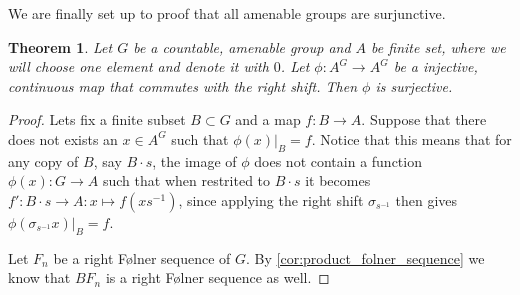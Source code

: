 \documentclass[titlepage, a4paper]{article}
\theoremstyle{theoremdd}
\newtheorem{theorem}{Theorem}[section]
\theoremstyle{definition}
\theoremstyle{remark}
\begin{document}
We are finally set up to proof that all amenable groups are surjunctive.
\begin{theorem}
	Let $G$ be a countable, amenable group and  $A$ be finite set, where we will choose one element and denote it with $0$. Let  $\phi: A^{G} \to A^{G}$ be a injective, continuous map that commutes with the right shift. Then $\phi$ is surjective.
\end{theorem}

\begin{proof}
	Lets fix a finite subset $B \subset G$ and a map $f:B\to A$. 
	Suppose that there does not exists an $x \in A^{G}$ such that $\phi(x)|_B = f$.
	Notice that this means that for any copy of $B$, say  $B\cdot s$, the image of $\phi$ does not contain a function  $\phi(x): G \to A$ such that when restrited to  $B\cdot s$ it becomes $f': B\cdot s \to A: x \mapsto f\left( x s^{-1} \right) $, since applying the right shift $\sigma_{s^{-1}}$ then gives $\phi(\sigma_{s^{-1}} x) |_{B} = f$.

	Let $F_n$ be a right Følner sequence of $G$. By \cref{cor:product_folner_sequence} we know that $BF_n$ is a right Følner sequence as well. 


\end{proof}
\end{document}
